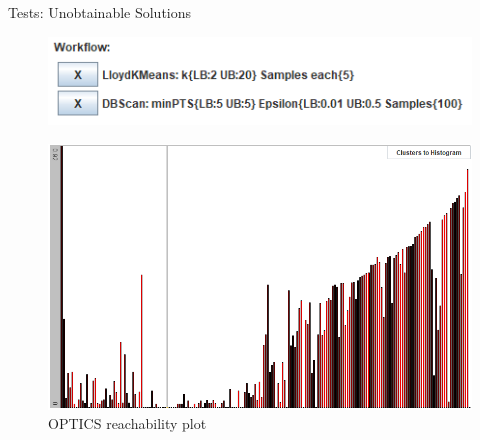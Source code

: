 \documentclass[aspectratio=169]{beamer}
\begin{document}
\begin{frame}{Tests: Unobtainable Solutions}
	\begin{figure}[h]
		\centering
		\includegraphics[width=.4\textwidth]{unob_wf}
		\label{fig:unob_wf}
	\end{figure}
	\begin{figure}[h]
		\centering
		\includegraphics[width=.64\textwidth]{unob_optics_stable}
		\caption{OPTICS reachability plot}
		\label{fig:unob_optics_stable}
	\end{figure}
\end{frame}
\end{document}
